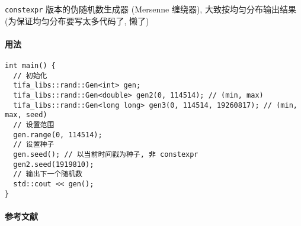 \verb|constexpr| 版本的伪随机数生成器 (Mersenne 缠绕器), 大致按均匀分布输出结果 (为保证均匀分布要写太多代码了, 懒了)

\paragraph{用法}

\begin{verbatim}
int main() {
  // 初始化
  tifa_libs::rand::Gen<int> gen;
  tifa_libs::rand::Gen<double> gen2(0, 114514); // (min, max)
  tifa_libs::rand::Gen<long long> gen3(0, 114514, 19260817); // (min, max, seed)
  // 设置范围
  gen.range(0, 114514);
  // 设置种子
  gen.seed(); // 以当前时间戳为种子, 非 constexpr
  gen2.seed(1919810);
  // 输出下一个随机数
  std::cout << gen();
}
\end{verbatim}

\paragraph{参考文献} \cite{matsumoto1998mersenne} \cite{szHugyi2013random} \cite{lemire2019fast}
